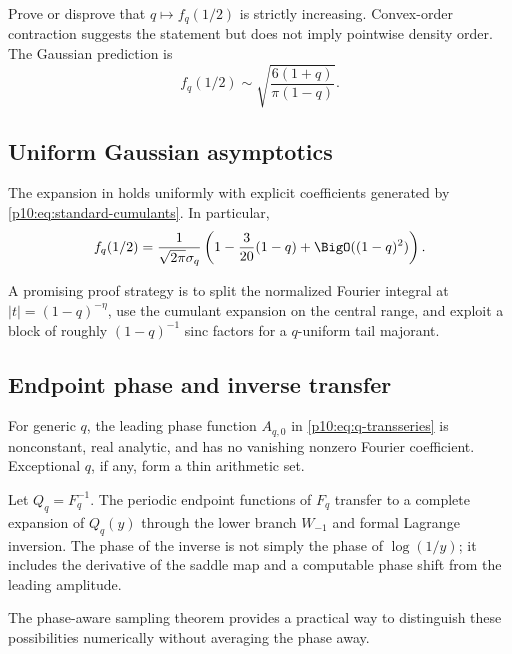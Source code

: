\documentclass[11pt]{article}
\numberwithin{equation}{section}
\theoremstyle{definition}
\theoremstyle{remark}
\begin{document}
\begin{problem}
Prove or disprove that $q\mapsto f_q(1/2)$ is strictly increasing.  Convex-order contraction
suggests the statement but does not imply pointwise density order.  The Gaussian prediction is
\[
 f_q(1/2)\sim\sqrt{\frac{6(1+q)}{\pi(1-q)}}.
\]
\end{problem}

\subsection{Uniform Gaussian asymptotics}

\begin{conjecture}
The expansion in  holds uniformly with explicit coefficients generated by
\eqref{p10:eq:standard-cumulants}.  In particular,
\[
 f_q(1/2)
 =\frac{1}{\sqrt{2\pi}\sigma_q}
  \left(1-\frac{3}{20}(1-q)+\BigO((1-q)^2)\right).
\]
\end{conjecture}

A promising proof strategy is to split the normalized Fourier integral at
$|t|=(1-q)^{-\eta}$, use the cumulant expansion on the central range, and exploit a block of
roughly $(1-q)^{-1}$ sinc factors for a $q$-uniform tail majorant.

\subsection{Endpoint phase and inverse transfer}

\begin{conjecture}
For generic $q$, the leading phase function $A_{q,0}$ in
\eqref{p10:eq:q-transseries} is nonconstant, real analytic, and has no vanishing nonzero Fourier
coefficient.  Exceptional $q$, if any, form a thin arithmetic set.
\end{conjecture}

\begin{conjecture}
Let $Q_q=F_q^{-1}$.  The periodic endpoint functions of $F_q$ transfer to a complete expansion
of $Q_q(y)$ through the lower branch $W_{-1}$ and formal Lagrange inversion.  The phase of the
inverse is not simply the phase of $\log(1/y)$; it includes the derivative of the saddle map
and a computable phase shift from the leading amplitude.
\end{conjecture}

The phase-aware sampling theorem provides a practical way to distinguish these possibilities
numerically without averaging the phase away.
\end{document}
